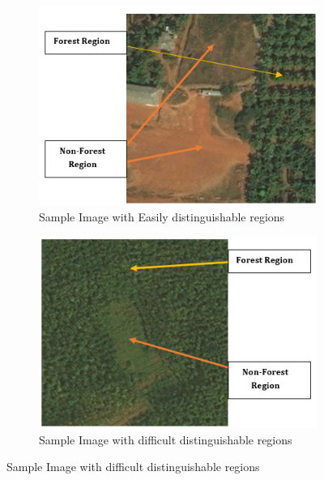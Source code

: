 \documentclass[rnd]{mas_proposal}
\begin{document}
\begin{figure}
        \centering
        \begin{subfigure}{.5\textwidth}
          \centering
          \includegraphics[width=1.0\linewidth]{images/fig1.PNG}
          \caption{Sample Image with Easily distinguishable regions}
          \label{fig:forest-easy}
        \end{subfigure}%
        \begin{subfigure}{.5\textwidth}
          \centering
          \includegraphics[width=1.0\linewidth]{images/fig2}
          \caption{Sample Image with difficult distinguishable regions}
          \label{fig:forest-hard}
        \end{subfigure}
\end{figure}


\end{document}
